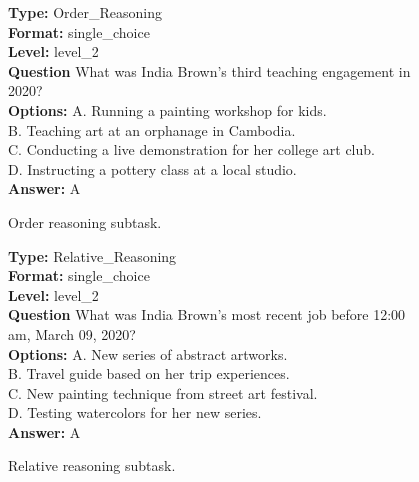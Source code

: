 \documentclass{article} %
\begin{document}
\begin{figure}[htbp]
\begin{tcolorbox}[
colframe=black!75!white, 
colback=white, sharp corners, 
boxrule=0.8pt, width=\textwidth,
title=Order Reasoning
] 
\textbf{Type:} Order\_Reasoning \\
\textbf{Format:} single\_choice \\
\textbf{Level:} level\_2 \\
\textbf{Question} What was India Brown’s third teaching engagement in 2020? \\
\textbf{Options:} A. Running a painting workshop for kids. \\
B. Teaching art at an orphanage in Cambodia. \\
C. Conducting a live demonstration for her college art club. \\
D. Instructing a pottery class at a local studio. \\
\textbf{Answer:} A
\end{tcolorbox} 
\caption{Order reasoning subtask.}
\label{fig:order_reasoning}
\end{figure}

\begin{figure}[htbp]
\begin{tcolorbox}[
colframe=black!75!white, 
colback=white, sharp corners, 
boxrule=0.8pt, width=\textwidth,
title=Relative Reasoning
] 
\textbf{Type:} Relative\_Reasoning \\
\textbf{Format:} single\_choice \\
\textbf{Level:} level\_2 \\
\textbf{Question} What was India Brown’s most recent job before 12:00 am, March 09, 2020? \\
\textbf{Options:} A. New series of abstract artworks. \\
B. Travel guide based on her trip experiences. \\
C. New painting technique from street art festival. \\
D. Testing watercolors for her new series. \\
\textbf{Answer:} A
\end{tcolorbox} 
\caption{Relative reasoning subtask.}
\label{fig:relative_reasoning}
\end{figure}
\end{document}
